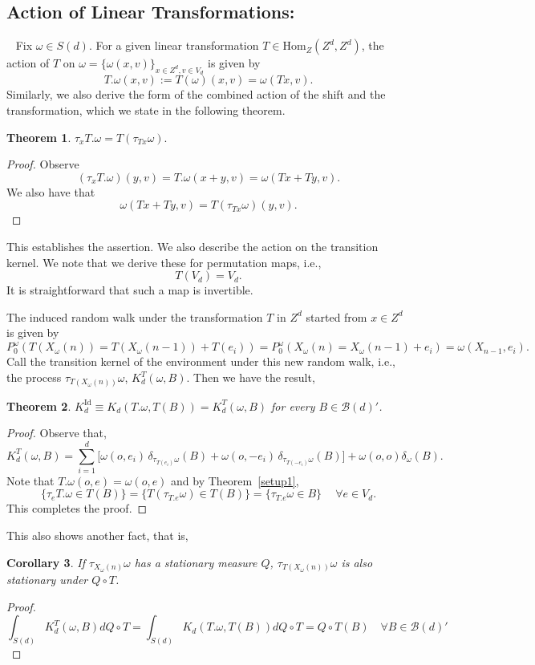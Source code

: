 \documentclass[final]{aomart}
\def\mathscr#1{#1}%
\def\mathbb#1{#1}%
\theoremstyle{plain}
\newtheorem{theorem}{Theorem}[section]
\newtheorem{corollary}[theorem]{Corollary}
\theoremstyle{definition}
\theoremstyle{remark}
\begin{document}
\subsection{Action of Linear Transformations:}~\label{Action}
Fix $\omega \in \mathscr{S}(d)$. For a given linear transformation $T \in \mathrm{Hom}_{\mathbb{Z}}(\mathbb{Z}^d, \mathbb{Z}^{d})$, the action of $T$ on $\omega = \{\omega(x,v)\}_{x \in \mathbb{Z}^d, v \in V_d}$ is given by 
\[
T.\omega(x,v) := T(\omega)(x,v) = \omega(Tx,v).
\]
Similarly, we also derive the form of the combined action of the shift and the transformation, which we state in the following theorem. 
\begin{theorem}{\label{setup1}}
    $\tau_xT.\omega = T(\tau_{Tx} \omega).$
\end{theorem}
\begin{proof}
    Observe \[(\tau_xT.\omega)(y,v) = T.\omega(x+y,v) = \omega(Tx +Ty,v).\] We also have that \[
    \omega(Tx +Ty,v) = T(\tau_{Tx} \omega)(y,v).
    \]
\end{proof}
This establishes the assertion.
We also describe the action on the transition kernel. We note that we derive these for permutation maps, i.e.,  \[
T(V_d) = V_d. 
\] 
It is straightforward that such a map is invertible.
 
The induced random walk under the transformation $T$ in $\mathbb{Z}^d$ started from $x\in \mathbb{Z}^{d}$ is given by \[
\mathbb{P}_0^{\omega} ( T(X_{\omega}(n)) = T(X_{\omega}({n-1})) + T(e_i)) = \mathbb{P}_0^{\omega}(X_{\omega}(n) =X_{\omega}({n-1}) +e_i) = \omega(X_{n-1},e_i).
\] 
Call the transition kernel of the environment under this new random walk, i.e., the process $\tau_{T(X_{\omega}(n))}\omega$, $K^T_d(\omega, B)$. Then we have the result, 
\begin{theorem}{\label{setup2}}
    $K_d^{\operatorname{Id}} \equiv K_d(T.\omega, T(B)) = K^T_d( \omega, B)$ for every $B \in {\mathcal{B}(d)'}$.
\end{theorem}
\begin{proof}
    Observe that, 
    \[
    K_d^T(\omega,B) 
= \sum_{i=1}^d \Big[ 
    \omega(o, e_i)\,\delta_{\tau_{T(e_i)}\omega}(B)  
    + \omega(o, -e_i)\,\delta_{\tau_{T(-e_i)}\omega}(B) 
\Big] +  \omega(o,o) \delta_{\omega}(B).
    \]
Note that $T.\omega(o,e) = \omega(o,e)$ and by Theorem~\ref{setup1}, \[
\{\tau_{e}{T.\omega} \in T(B)\} = \{T(\tau_{T.e}\omega) \in T(B)\} = \{\tau_{T.e}\omega  \in B\} \quad~\forall e \in V_d.  
\]
This completes the proof.
\end{proof}
This also shows another fact, that is,
\begin{corollary}{\label{setup3}}
    If $\tau_{X_{\omega}(n)} \omega$ has a stationary measure $Q$, $\tau_{T(X_{\omega}(n))} \omega$ is also stationary under $Q\circ T$.  
\end{corollary}
\begin{proof}
 \[
 \int_{\mathscr{S}(d)} K_d^{T}(\omega,B) dQ \circ T = \int_{\mathscr{S}(d)} K_d(T.\omega,T(B)) dQ \circ T= Q\circ T(B) \quad\forall B \in \mathcal{B}({d})'
 \]   
\end{proof}
\end{document}
